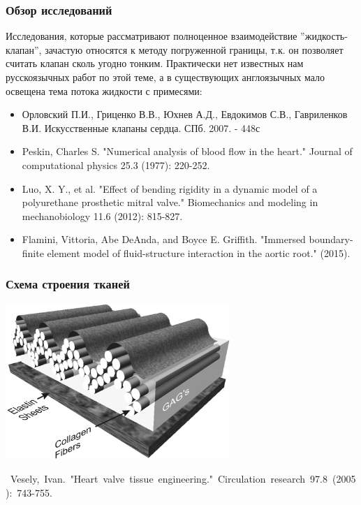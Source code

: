 \documentclass[14pt]{beamer}
\begin{document}
\begin{frame}
\frametitle{Обзор исследований}
    Исследования, которые рассматривают полноценное взаимодействие ''жидкость-клапан'', зачастую относятся 
    к методу погруженной границы, т.к. он позволяет считать клапан сколь угодно тонким. Практически нет
    известных нам русскоязычных работ по этой теме, а в существующих англоязычных мало освещена тема потока
    жидкости с примесями:
    \par
    {\tiny
        \begin{itemize}
            \item[\MVRightarrow] Орловский П.И., Гриценко В.В., Юхнев А.Д., Евдокимов С.В., Гавриленков В.И. Искусственные клапаны сердца. СПб. 2007. - 448с
            \item[\MVRightarrow] Peskin, Charles S. "Numerical analysis of blood flow in the heart." Journal of computational physics 25.3 (1977): 220-252.
            \item[\MVRightarrow] Luo, X. Y., et al. "Effect of bending rigidity in a dynamic model of a polyurethane prosthetic mitral valve." Biomechanics and modeling in mechanobiology 11.6 (2012): 815-827.
            \item[\MVRightarrow] Flamini, Vittoria, Abe DeAnda, and Boyce E. Griffith. "Immersed boundary-finite element model of fluid-structure interaction in the aortic root." (2015).
        \end{itemize}
    }
\end{frame}

\begin{frame}
\frametitle{Схема строения тканей}
    \begin{center}
        \includegraphics[width=8.5cm]{valve_tissue_structure.jpg}
    \end{center}

    \begin{spacing}{0.5}
        \mbox{\scriptsize
            Vesely, Ivan. "Heart valve tissue engineering." Circulation research 97.8 (2005): 743-755.
        }
    \end{spacing}

\end{frame}
\end{document}

